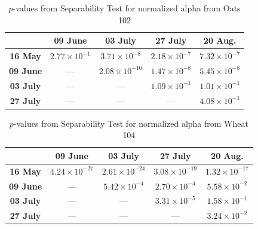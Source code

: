 \documentclass[journal]{IEEEtran}
\begin{document}
\begin{table}[hbt]
  \footnotesize
  \centering
  \caption{$p$-values from Separability Test for normalized alpha from Oats 102}
  \label{tab:pvalues_sep_alpha_ot102}
  \begin{tabular}{ccccc}
  \toprule
  & \textbf{09 June} & \textbf{03 July} & \textbf{27 July} & \textbf{20 Aug.}\\ \midrule
  \textbf{16 May}  & $2.77 \times 10^{-1}$ & $3.71 \times 10^{-8}$ & $2.18 \times 10^{-7}$ & $7.32 \times 10^{-7}$ \\
  \textbf{09 June}  & --- & $2.08 \times 10^{-10}$ & $1.47 \times 10^{-8}$ & $5.45 \times 10^{-8}$ \\
  \textbf{03 July}  & --- & --- & $1.09 \times 10^{-1}$ & $1.01 \times 10^{-1}$\\
  \textbf{27 July}  & --- & --- & --- & $4.08 \times 10^{-1}$ \\
  \bottomrule
  \end{tabular}
\end{table}

\begin{table}[hbt]
  \footnotesize
  \centering
  \caption{$p$-values from Separability Test for normalized alpha from Wheat 104}
  \label{tab:pvalues_sep_alpha_wt104}
  \begin{tabular}{ccccc}
  \toprule
  & \textbf{09 June} & \textbf{03 July} & \textbf{27 July} & \textbf{20 Aug.}\\ \midrule
  \textbf{16 May}  & $4.24 \times 10^{-27}$ & $2.61 \times 10^{-24}$ & $3.08 \times 10^{-19}$ & $1.32 \times 10^{-17}$ \\
  \textbf{09 June}  & --- & $5.42 \times 10^{-4}$ & $2.70 \times 10^{-4}$ & $5.58 \times 10^{-2}$ \\
  \textbf{03 July}  & --- & --- & $3.31 \times 10^{-5}$ & $1.58 \times 10^{-1}$\\
  \textbf{27 July}  & --- & --- & --- & $3.24 \times 10^{-2}$ \\
  \bottomrule
  \end{tabular}
\end{table}


\end{document}
